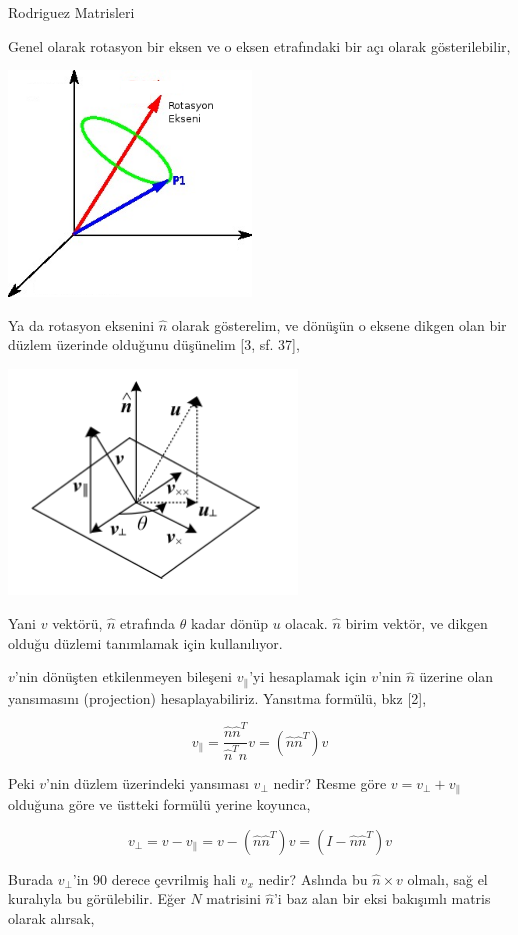\documentclass[12pt,fleqn]{article}\usepackage{../../common}
\begin{document}
Rodriguez Matrisleri

Genel olarak rotasyon bir eksen ve o eksen etrafındaki bir açı olarak
gösterilebilir,

\includegraphics[height=6cm]{rotation.png}

Ya da rotasyon eksenini $\hat{n}$ olarak gösterelim, ve dönüşün o eksene
dikgen olan bir düzlem üzerinde olduğunu düşünelim [3, sf. 37],

\includegraphics[height=6cm]{rotation2.png}

Yani $v$ vektörü, $\hat{n}$ etrafında $\theta$ kadar dönüp $u$ olacak. $\hat{n}$ birim vektör, 
ve dikgen olduğu düzlemi tanımlamak için kullanılıyor.

$v$'nin dönüşten etkilenmeyen bileşeni $v_\parallel$'yi hesaplamak için
$v$'nin $\hat{n}$ üzerine olan yansımasını (projection) hesaplayabiliriz. 
Yansıtma formülü, bkz [2],

$$ v_\parallel =  \frac{\hat{n}\hat{n}^T}{\hat{n}^T\hat{n}} v 
= (\hat{n}\hat{n}^T) v
$$

Peki $v$'nin düzlem üzerindeki yansıması $v_\perp$ nedir? Resme göre $v =
v_\perp + v_\parallel$ olduğuna göre ve üstteki formülü yerine koyunca,

$$ v_\perp = v - v_\parallel 
= v - (\hat{n}\hat{n}^T) v 
= (I - \hat{n}\hat{n}^T) v
$$

Burada $v_\perp$'in 90 derece çevrilmiş hali $v_x$ nedir? Aslında bu
$\hat{n} \times v$ olmalı, sağ el kuralıyla bu görülebilir. Eğer $N$
matrisini $\hat{n}$'i baz alan bir eksi bakışımlı matris olarak alırsak, 
\end{document}
